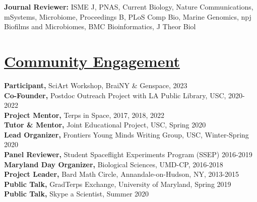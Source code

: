\documentclass[]{res}
\begin{document}
\begin{resume}
{\bf Journal Reviewer:} ISME J, PNAS, Current Biology, Nature Communications, mSystems, Microbiome, Proceedings B, PLoS Comp Bio, Marine Genomics, npj Biofilms and Microbiomes, BMC Bioinformatics, J Theor Biol

\newpage

\section{\underline{Community Engagement}}\vspace{2mm}
{\bf Participant,} SciArt Workshop, BraiNY \& Genspace, 2023\\
{\bf Co-Founder,} Postdoc Outreach Project with LA Public Library, USC, 2020-2022\\
{\bf Project Mentor,} Terps in Space, 2017, 2018, 2022\\
{\bf Tutor \& Mentor,} Joint Educational Project, USC, Spring 2020\\
{\bf Lead Organizer,} Frontiers Young Minds Writing Group, USC, Winter-Spring 2020\\
{\bf Panel Reviewer,} Student Spaceflight Experiments Program (SSEP) 2016-2019\\
{\bf Maryland Day Organizer,} Biological Sciences, UMD-CP, 2016-2018\\
{\bf Project Leader,} Bard Math Circle, Annandale-on-Hudson, NY, 2013-2015 \\
{\bf Public Talk,} GradTerps Exchange, University of Maryland, Spring 2019\\
{\bf Public Talk,} Skype a Scientist, Summer 2020

  

\end{resume}
\end{document}
